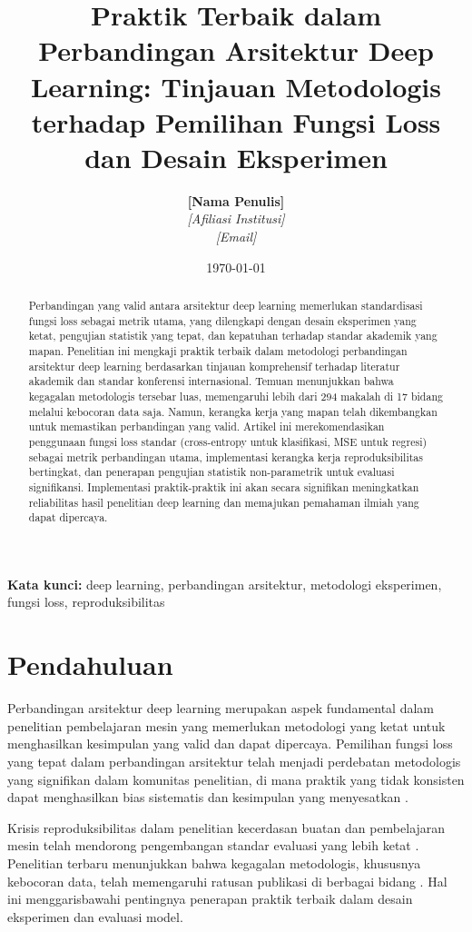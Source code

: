 \documentclass[12pt,a4paper]{article}
\title{\textbf{Praktik Terbaik dalam Perbandingan Arsitektur Deep Learning: Tinjauan Metodologis terhadap Pemilihan Fungsi Loss dan Desain Eksperimen}}
\author{
\textbf{[Nama Penulis]}\\
\textit{[Afiliasi Institusi]}\\
\textit{[Email]}
}
\date{\today}
\begin{document}
\maketitle

\begin{abstract}
Perbandingan yang valid antara arsitektur deep learning memerlukan standardisasi fungsi loss sebagai metrik utama, yang dilengkapi dengan desain eksperimen yang ketat, pengujian statistik yang tepat, dan kepatuhan terhadap standar akademik yang mapan. Penelitian ini mengkaji praktik terbaik dalam metodologi perbandingan arsitektur deep learning berdasarkan tinjauan komprehensif terhadap literatur akademik dan standar konferensi internasional. Temuan menunjukkan bahwa kegagalan metodologis tersebar luas, memengaruhi lebih dari 294 makalah di 17 bidang melalui kebocoran data saja. Namun, kerangka kerja yang mapan telah dikembangkan untuk memastikan perbandingan yang valid. Artikel ini merekomendasikan penggunaan fungsi loss standar (cross-entropy untuk klasifikasi, MSE untuk regresi) sebagai metrik perbandingan utama, implementasi kerangka kerja reproduksibilitas bertingkat, dan penerapan pengujian statistik non-parametrik untuk evaluasi signifikansi. Implementasi praktik-praktik ini akan secara signifikan meningkatkan reliabilitas hasil penelitian deep learning dan memajukan pemahaman ilmiah yang dapat dipercaya.
\end{abstract}

\textbf{Kata kunci:} deep learning, perbandingan arsitektur, metodologi eksperimen, fungsi loss, reproduksibilitas

\section{Pendahuluan}

Perbandingan arsitektur deep learning merupakan aspek fundamental dalam penelitian pembelajaran mesin yang memerlukan metodologi yang ketat untuk menghasilkan kesimpulan yang valid dan dapat dipercaya. Pemilihan fungsi loss yang tepat dalam perbandingan arsitektur telah menjadi perdebatan metodologis yang signifikan dalam komunitas penelitian, di mana praktik yang tidak konsisten dapat menghasilkan bias sistematis dan kesimpulan yang menyesatkan \citep{kapoor2022leakage}.

Krisis reproduksibilitas dalam penelitian kecerdasan buatan dan pembelajaran mesin telah mendorong pengembangan standar evaluasi yang lebih ketat \citep{desai2025reproducibility}. Penelitian terbaru menunjukkan bahwa kegagalan metodologis, khususnya kebocoran data, telah memengaruhi ratusan publikasi di berbagai bidang \citep{kapoor2022leakage}. Hal ini menggarisbawahi pentingnya penerapan praktik terbaik dalam desain eksperimen dan evaluasi model.
\end{document}
